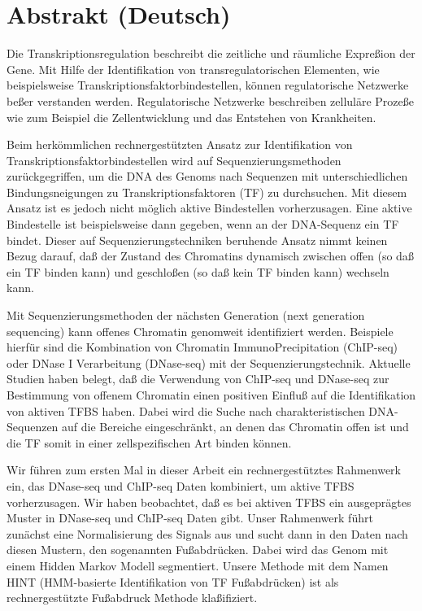 \chapter*{Abstrakt (Deutsch)}

Die Transkriptionsregulation beschreibt die zeitliche und r{\"a}umliche Expre{\ss}ion der Gene. Mit Hilfe der Identifikation von transregulatorischen Elementen, wie beispielsweise \linebreak Transkriptionsfaktorbindestellen, k{\"o}nnen regulatorische Netzwerke be{\ss}er verstanden werden. \linebreak Regulatorische Netzwerke beschreiben zellul{\"a}re Proze{\ss}e wie zum Beispiel die Zellentwicklung und das Entstehen von Krankheiten.

Beim herk{\"o}mmlichen rechnergest{\"u}tzten Ansatz zur Identifikation von \linebreak Transkriptionsfaktorbindestellen wird auf Sequenzierungsmethoden zur{\"u}ckgegriffen, um die DNA des Genoms nach Sequenzen mit unterschiedlichen Bindungsneigungen zu Transkriptionsfaktoren (TF) zu durchsuchen. Mit diesem Ansatz ist es jedoch nicht m{\"o}glich aktive Bindestellen \linebreak vorherzusagen. Eine aktive Bindestelle ist beispielsweise dann gegeben, wenn an der DNA-Sequenz ein TF bindet. Dieser auf Sequenzierungstechniken beruhende Ansatz nimmt keinen Bezug \linebreak darauf, da{\ss} der Zustand des Chromatins dynamisch zwischen offen (so da{\ss} ein TF binden kann) und geschlo{\ss}en (so da{\ss} kein TF binden kann) wechseln kann.

Mit Sequenzierungsmethoden der n{\"a}chsten Generation (next generation sequencing) kann offenes Chromatin genomweit identifiziert werden. Beispiele hierf{\"u}r sind die Kombination von Chromatin ImmunoPrecipitation (ChIP-seq) oder DNase I Verarbeitung (DNase-seq) mit der \linebreak Sequenzierungstechnik. Aktuelle Studien haben belegt, da{\ss} die Verwendung von ChIP-seq und DNase-seq zur Bestimmung von offenem Chromatin einen positiven Einflu{\ss} auf die Identifikation von aktiven TFBS haben. Dabei wird die Suche nach charakteristischen DNA-Sequenzen auf die Bereiche eingeschr{\"a}nkt, an denen das Chromatin offen ist und die TF somit in einer zellspezifischen Art binden k{\"o}nnen.

Wir f{\"u}hren zum ersten Mal in dieser Arbeit ein rechnergest{\"u}tztes Rahmenwerk ein, das DNase-seq und ChIP-seq Daten kombiniert, um aktive TFBS vorherzusagen. Wir haben beobachtet, da{\ss} es bei aktiven TFBS ein ausgepr{\"a}gtes Muster in DNase-seq und ChIP-seq Daten gibt. Unser \linebreak Rahmenwerk f{\"u}hrt zun{\"a}chst eine Normalisierung des Signals aus und sucht dann in den Daten nach diesen Mustern, den sogenannten Fu{\ss}abdr{\"u}cken. Dabei wird das Genom mit einem Hidden Markov Modell segmentiert. Unsere Methode mit dem Namen HINT (HMM-basierte Identifikation von TF Fu{\ss}abdr{\"u}cken) ist als {\glqq}rechnergest{\"u}tzte Fu{\ss}abdruck Methode{\grqq} kla{\ss}ifiziert. 

